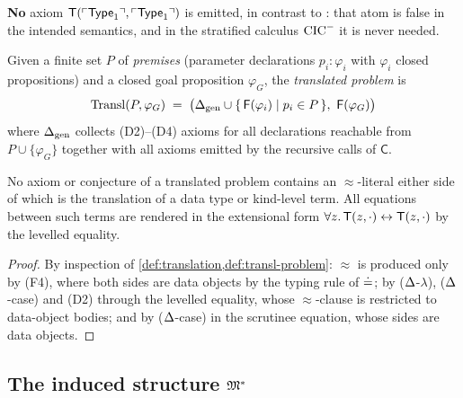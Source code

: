 \begin{definition}
\begin{enumerate}[label=(D\arabic*),leftmargin=3em]
  \textbf{No} axiom $\mathsf{T}(\ulcorner \mathsf{Type}_1 \urcorner, \ulcorner \mathsf{Type}_1 \urcorner)$ is
  emitted, in contrast to \cite[\S5.4]{CzajkaKaliszyk2018}: that
  atom is false in the intended semantics, and in the stratified
  calculus $\mathrm{CIC}^{-}$ it is never needed.
\end{enumerate}
Given a finite set $P$ of \emph{premises} (parameter declarations
$p_i : \varphi_i$ with $\varphi_i$ closed propositions) and a closed
goal proposition $\varphi_G$, the \emph{translated problem} is
\[
  \mathrm{Transl}(P, \varphi_G) \;=\;
  \bigl( \Delta_{\mathrm{gen}} \cup \{\,\mathsf{F}(\varphi_i) \mid p_i \in P\,\},\
         \mathsf{F}(\varphi_G) \bigr)
\]
where $\Delta_{\mathrm{gen}}$ collects (D2)--(D4) axioms for all
declarations reachable from $P \cup \{\varphi_G\}$ together with all
axioms emitted by the recursive calls of $\mathsf{C}$.
\end{definition}

\begin{lemma}
\label{lem:no-type-eq}
No axiom or conjecture of a translated problem contains an
$\approx$-literal either side of which is the translation of a data
type or kind-level term.  All equations between such terms are
rendered in the extensional form $\forall z.\, \mathsf{T}(z,\cdot)
\leftrightarrow \mathsf{T}(z,\cdot)$ by the levelled equality.
\end{lemma}

\begin{proof}
By inspection of \cref{def:translation,def:transl-problem}:
$\approx$ is produced only by (F4), where both sides are data
objects by the typing rule of $\doteq$; by ($\Delta$-$\lambda$),
($\Delta$-case) and (D2) through the levelled equality, whose
$\approx$-clause is restricted to data-object bodies; and by
($\Delta$-case) in the scrutinee equation, whose sides are data
objects.
\end{proof}

\subsection{The induced structure \texorpdfstring{$\mathfrak{M}^{*}$}{M*}}

